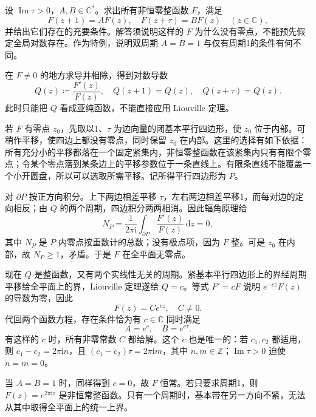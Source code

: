 \begin{exercise}[具有乘法周期的整函数]\label{b3:ex:12-4}
设 \(\operatorname{Im}\tau>0\)，\(A,B\in\mathbb C^*\)。求出所有非恒零整函数 \(F\)，满足
\[
 F(z+1)=A F(z),\quad F(z+\tau)=B F(z)\quad(z\in\mathbb C),
\]
并给出它们存在的充要条件。解答须说明这样的 \(F\) 为什么没有零点，不能预先假定全局对数存在。作为特例，说明双周期 \(A=B=1\) 与仅有周期1的条件有何不同。
\end{exercise}
\begin{solution}
在 \(F\ne0\) 的地方求导并相除，得到对数导数
\[
 Q(z)\coloneqq\frac{F'(z)}{F(z)},\quad
 Q(z+1)=Q(z),\quad Q(z+\tau)=Q(z).
\]
此时只能把 \(Q\) 看成亚纯函数，不能直接应用 Liouville 定理。

若 \(F\) 有零点 \(z_0\)，先取以1、\(\tau\) 为边向量的闭基本平行四边形，使 \(z_0\) 位于内部。可稍作平移，使四边上都没有零点，同时保留 \(z_0\) 在内部。这里的选择有如下依据：所有充分小的平移都落在一个固定紧集内，非恒零整函数在该紧集内只有有限个零点；令某个零点落到某条边上的平移参数位于一条直线上。有限条直线不能覆盖一个小开圆盘，所以可以选取所需平移。记所得平行四边形为 \(P\)。

对 \(\partial P\) 按正方向积分。上下两边相差平移 \(\tau\)，左右两边相差平移1，而每对边的定向相反；由 \(Q\) 的两个周期，四边积分两两相消。因此辐角原理给
\[
 N_P=\frac1{2\pi\mathrm i}\int_{\partial P}\frac{F'(z)}{F(z)}\,\mathrm dz=0,
\]
其中 \(N_P\) 是 \(P\) 内零点按重数计的总数；没有极点项，因为 \(F\) 整。可是 \(z_0\) 在内部，故 \(N_P\ge1\)，矛盾。于是 \(F\) 在全平面无零点。

现在 \(Q\) 是整函数，又有两个实线性无关的周期。紧基本平行四边形上的界经周期平移给全平面上的界，Liouville 定理遂给 \(Q=c\)。等式 \(F'=cF\) 说明 \(e^{-cz}F(z)\) 的导数为零，因此
\[
 F(z)=Ce^{cz},\quad C\ne0.
\]
代回两个函数方程，存在条件恰为有 \(c\in\mathbb C\) 同时满足
\[
 A=e^c,\quad B=e^{c\tau}.
\]
有这样的 \(c\) 时，所有非零常数 \(C\) 都给解。这个 \(c\) 也是唯一的：若 \(c_1,c_2\) 都适用，则 \(c_1-c_2=2\pi\mathrm i n\)，且 \((c_1-c_2)\tau=2\pi\mathrm i m\)，其中 \(n,m\in\mathbb Z\)；\(\operatorname{Im}\tau>0\) 迫使 \(n=m=0\)。

当 \(A=B=1\) 时，同样得到 \(c=0\)，故 \(F\) 恒常。若只要求周期1，则 \(F(z)=e^{2\pi\mathrm i z}\) 是非恒常整函数。只有一个周期时，基本带在另一方向不紧，无法从其中取得全平面上的统一上界。
\end{solution}

